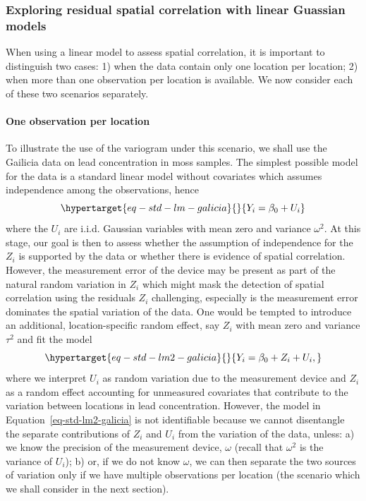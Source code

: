 \documentclass[
  letterpaper,
]{krantz}
\let\oldparagraph\paragraph
\renewcommand{\paragraph}[1]{\oldparagraph{#1}\mbox{}}
\begin{document}
\hypertarget{sec-empirical-variog-lm}{%
\subsubsection{Exploring residual spatial correlation with linear
Guassian models}\label{sec-empirical-variog-lm}}

When using a linear model to assess spatial correlation, it is important
to distinguish two cases: 1) when the data contain only one location per
location; 2) when more than one observation per location is available.
We now consider each of these two scenarios separately.

\hypertarget{one-observation-per-location}{%
\paragraph{One observation per
location}\label{one-observation-per-location}}

To illustrate the use of the variogram under this scenario, we shall use
the Gailicia data on lead concentration in moss samples. The simplest
possible model for the data is a standard linear model without
covariates which assumes independence among the observations, hence
\begin{equation}\protect\hypertarget{eq-std-lm-galicia}{}{
Y_i = \beta_0 + U_i
}\label{eq-std-lm-galicia}\end{equation} where the \(U_i\) are i.i.d.
Gaussian variables with mean zero and variance \(\omega^2\). At this
stage, our goal is then to assess whether the assumption of independence
for the \(Z_i\) is supported by the data or whether there is evidence of
spatial correlation. However, the measurement error of the device may be
present as part of the natural random variation in \(Z_i\) which might
mask the detection of spatial correlation using the residuals \(Z_i\)
challenging, especially is the measurement error dominates the spatial
variation of the data. One would be tempted to introduce an additional,
location-specific random effect, say \(Z_i\) with mean zero and variance
\(\tau^2\) and fit the model
\begin{equation}\protect\hypertarget{eq-std-lm2-galicia}{}{
Y_i = \beta_0 + Z_i + U_i,
}\label{eq-std-lm2-galicia}\end{equation} where we interpret \(U_i\) as
random variation due to the measurement device and \(Z_i\) as a random
effect accounting for unmeasured covariates that contribute to the
variation between locations in lead concentration. However, the model in
Equation~\ref{eq-std-lm2-galicia} is not identifiable because we cannot
disentangle the separate contributions of \(Z_i\) and \(U_i\) from the
variation of the data, unless: a) we know the precision of the
measurement device, \(\omega\) (recall that \(\omega^2\) is the variance
of \(U_i\)); b) or, if we do not know \(\omega\), we can then separate
the two sources of variation only if we have multiple observations per
location (the scenario which we shall consider in the next section).
\end{document}
